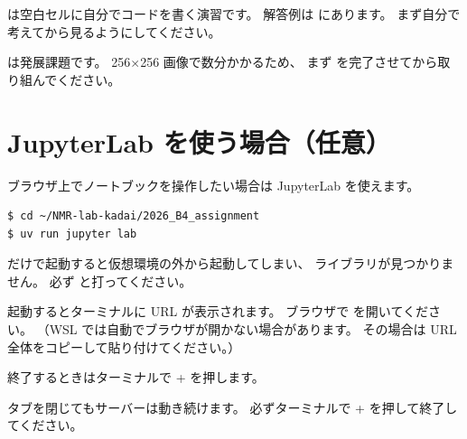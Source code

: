 \begin{notebox}[No.4 は演習形式]
 は空白セルに自分でコードを書く演習です。
解答例は  にあります。
まず自分で考えてから見るようにしてください。
\end{notebox}

\begin{notebox}
 は発展課題です。
256$\times$256 画像で数分かかるため、
まず  を完了させてから取り組んでください。
\end{notebox}

\section{JupyterLab を使う場合（任意）}

ブラウザ上でノートブックを操作したい場合は JupyterLab を使えます。

\begin{wslbox}
\begin{lstlisting}[style=bash]
$ cd ~/NMR-lab-kadai/2026_B4_assignment
$ uv run jupyter lab
\end{lstlisting}
\end{wslbox}

\begin{warnbox}
 だけで起動すると仮想環境の外から起動してしまい、
ライブラリが見つかりません。
必ず  と打ってください。
\end{warnbox}

起動するとターミナルに URL が表示されます。
ブラウザで  を開いてください。
（WSL では自動でブラウザが開かない場合があります。
その場合は URL 全体をコピーして貼り付けてください。）

終了するときはターミナルで  +  を押します。

\begin{warnbox}[ブラウザのタブを閉じるだけでは終了しない]
タブを閉じてもサーバーは動き続けます。
必ずターミナルで  +  を押して終了してください。
\end{warnbox}
